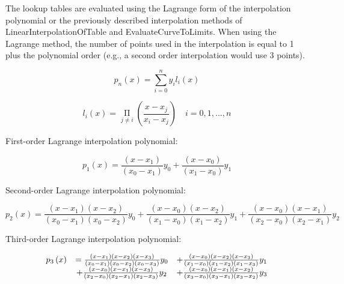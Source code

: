 The lookup tables are evaluated using the Lagrange form of the interpolation polynomial or the previously described interpolation methods of LinearInterpolationOfTable and EvaluateCurveToLimits. When using the Lagrange method, the number of points used in the interpolation is equal to 1 plus the polynomial order (e.g., a second order interpolation would use 3 points).

\begin{equation}
{p_n}\left( x \right) = \sum\limits_{i = 0}^n {{y_i}{l_i}\left( x \right)}
\end{equation}

\begin{equation}
{l_i}\left( x \right) = \mathop \Pi \limits_{j \ne i} \left( {\frac{{x - {x_j}}}{{{x_i} - {x_j}}}} \right)\,\,\,\,\,\,i = 0,1,...,n
\end{equation}

First-order Lagrange interpolation polynomial:

\begin{equation}
{p_1}\left( x \right) = \frac{{\left( {x - {x_1}} \right)}}{{\left( {{x_0} - {x_1}} \right)}}{y_0} + \frac{{\left( {x - {x_0}} \right)}}{{\left( {{x_1} - {x_0}} \right)}}{y_1}
\end{equation}

Second-order Lagrange interpolation polynomial:

\begin{equation}
{p_2}\left( x \right) = \frac{{\left( {x - {x_1}} \right)\left( {x - {x_2}} \right)}}{{\left( {{x_0} - {x_1}} \right)\left( {{x_0} - {x_2}} \right)}}{y_0} + \frac{{\left( {x - {x_0}} \right)\left( {x - {x_2}} \right)}}{{\left( {{x_1} - {x_0}} \right)\left( {{x_1} - {x_2}} \right)}}{y_1} + \frac{{\left( {x - {x_0}} \right)\left( {x - {x_1}} \right)}}{{\left( {{x_2} - {x_0}} \right)\left( {{x_2} - {x_1}} \right)}}{y_2}
\end{equation}

Third-order Lagrange interpolation polynomial:

\begin{equation}
\begin{array}{ccc}
  p_3\PB{x} &= \frac{\PB{x-x_{1}}\PB{x-x_{2}}\PB{x-x_{3}}} {\PB{x_{0}-x_{1}}\PB{x_{0}-x_{2}}\PB{x_{0}-x_{3}}} y_0
            &+ \frac{\PB{x-x_{0}}\PB{x-x_{2}}\PB{x-x_{3}}} {\PB{x_{1}-x_{0}}\PB{x_{1}-x_{2}}\PB{x_{1}-x_{3}}} y_1 \\
            &+ \frac{\PB{x-x_{0}}\PB{x-x_{1}}\PB{x-x_{3}}} {\PB{x_{2}-x_{0}}\PB{x_{2}-x_{1}}\PB{x_{2}-x_{3}}} y_2
            &+ \frac{\PB{x-x_{0}}\PB{x-x_{1}}\PB{x-x_{2}}} {\PB{x_{3}-x_{0}}\PB{x_{3}-x_{1}}\PB{x_{3}-x_{2}}} y_3
\end{array}
\end{equation}

